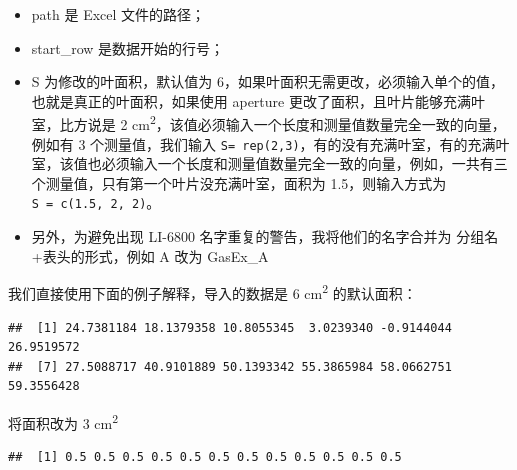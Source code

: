 \documentclass[
]{krantz}
\makeatletter
\newenvironment{Shaded}{\begin{snugshade}}{\end{snugshade}}
\newcommand{\DataTypeTok}[1]{\textcolor[rgb]{0.13,0.29,0.53}{#1}}
\newcommand{\DecValTok}[1]{\textcolor[rgb]{0.00,0.00,0.81}{#1}}
\newcommand{\KeywordTok}[1]{\textcolor[rgb]{0.13,0.29,0.53}{\textbf{#1}}}
\newcommand{\NormalTok}[1]{#1}
\newcommand{\OperatorTok}[1]{\textcolor[rgb]{0.81,0.36,0.00}{\textbf{#1}}}
\newcommand{\StringTok}[1]{\textcolor[rgb]{0.31,0.60,0.02}{#1}}
\newenvironment{kframe}{%
\medskip{}
\setlength{\fboxsep}{.8em}
 \def\at@end@of@kframe{}%
 \ifinner\ifhmode%
  \def\at@end@of@kframe{\end{minipage}}%
  \begin{minipage}{\columnwidth}%
 \fi\fi%
 \def\FrameCommand##1{\hskip\@totalleftmargin \hskip-\fboxsep
 \colorbox{shadecolor}{##1}\hskip-\fboxsep
     \hskip-\linewidth \hskip-\@totalleftmargin \hskip\columnwidth}%
 \MakeFramed {\advance\hsize-\width
   \@totalleftmargin\z@ \linewidth\hsize
   \@setminipage}}%
 {\par\unskip\endMakeFramed%
 \at@end@of@kframe}
\renewenvironment{Shaded}{\begin{kframe}}{\end{kframe}}
\makeatother
\begin{document}
\begin{itemize}
\item
  path 是 Excel 文件的路径；
\item
  start\_row 是数据开始的行号；
\item
  S 为修改的叶面积，默认值为 6，如果叶面积无需更改，必须输入单个的值，也就是真正的叶面积，如果使用 aperture 更改了面积，且叶片能够充满叶室，比方说是 2 cm\textsuperscript{2}，该值必须输入一个长度和测量值数量完全一致的向量，例如有 3 个测量值，我们输入 \texttt{S=\ rep(2,3)}，有的没有充满叶室，有的充满叶室，该值也必须输入一个长度和测量值数量完全一致的向量，例如，一共有三个测量值，只有第一个叶片没充满叶室，面积为 1.5，则输入方式为 \texttt{S\ =\ c(1.5,\ 2,\ 2)}。
\item
  另外，为避免出现 LI-6800 名字重复的警告，我将他们的名字合并为 分组名+表头的形式，例如 A 改为 GasEx\_A
\end{itemize}

我们直接使用下面的例子解释，导入的数据是 6 cm\textsuperscript{2} 的默认面积：

\begin{Shaded}
\end{Shaded}

\begin{verbatim}
##  [1] 24.7381184 18.1379358 10.8055345  3.0239340 -0.9144044 26.9519572
##  [7] 27.5088717 40.9101889 50.1393342 55.3865984 58.0662751 59.3556428
\end{verbatim}

将面积改为 3 cm\textsuperscript{2}

\begin{Shaded}
\end{Shaded}

\begin{verbatim}
##  [1] 0.5 0.5 0.5 0.5 0.5 0.5 0.5 0.5 0.5 0.5 0.5 0.5
\end{verbatim}
\end{document}
